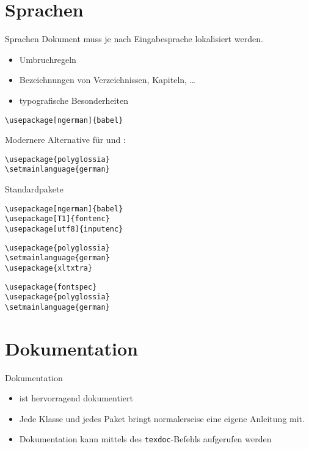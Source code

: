 \documentclass[
	vorläufig=false,
	aspectratio=1610,
	datum=2018-10-22,
	titel={Allgemeine Formatierung und Pakete},
	web=true,
	max,
]{../tex/latexkurs-slides}
\begin{document}
\section{Sprachen}
\begin{frame}[fragile]{Sprachen}
Dokument muss je nach Eingabesprache lokalisiert werden.
\begin{itemize}
	\item Umbruchregeln
	\item Bezeichnungen von Verzeichnissen, Kapiteln, …
	\item typografische Besonderheiten
\end{itemize}
\begin{lstlisting}
\usepackage[ngerman]{babel}
\end{lstlisting}
\pause
\vfill
Modernere Alternative für  und \XeLaTeX:
\begin{lstlisting}
\usepackage{polyglossia}
\setmainlanguage{german}
\end{lstlisting}
\end{frame}


\begin{frame}[fragile]{Standardpakete}
\begin{lstlisting}
\usepackage[ngerman]{babel}
\usepackage[T1]{fontenc}
\usepackage[utf8]{inputenc}
\end{lstlisting}
\vfill
\XeLaTeX {}
\begin{lstlisting}
\usepackage{polyglossia}
\setmainlanguage{german}
\usepackage{xltxtra}
\end{lstlisting}
\vfill
{}
\begin{lstlisting}
\usepackage{fontspec}
\usepackage{polyglossia}
\setmainlanguage{german}
\end{lstlisting}
\end{frame}

\section{Dokumentation}
\begin{frame}{Dokumentation}
	\begin{itemize}
		\item {} ist hervorragend dokumentiert
		\item Jede Klasse und jedes Paket bringt normalerseise eine eigene Anleitung mit.
		\item Dokumentation kann mittels des \texttt{texdoc}-Befehls aufgerufen werden
	\end{itemize}
\end{frame}
\end{document}
